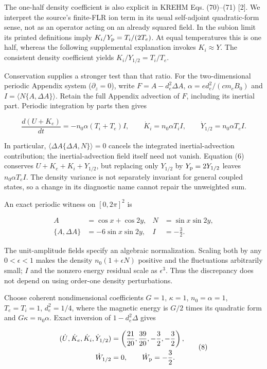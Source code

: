 The one-half density coefficient is also explicit in KREHM Eqs.
(70)--(71) {[}2{]}. We interpret the source's finite-FLR ion term in its
usual self-adjoint quadratic-form sense, not as an operator acting on an
already squared field. In the subion limit its printed definitions imply
\(K_i/Y_{\rm p}=T_i/(2T_e)\). At equal temperatures this is one half,
whereas the following supplemental explanation invokes \(K_i\approx Y\).
The consistent density coefficient yields \(K_i/Y_{1/2}=T_i/T_e\).

Conservation supplies a stronger test than that ratio. For the
two-dimensional periodic Appendix system (\(\partial_z=0\)), write
\(F=A-d_e^2\Delta A\), \(\alpha=ed_e^2/(cm_eB_0)\) and
\(I=\langle N\{A,\Delta A\}\rangle\). Retain the full Appendix advection
of \(F\), including its inertial part. Periodic integration by parts
then gives

\[
\frac{d(U+K_e)}{dt}=-n_0\alpha(T_i+T_e)I,\qquad
\dot K_i=n_0\alpha T_i I,\qquad
\dot Y_{1/2}=n_0\alpha T_e I.
\tag{6}
\]

In particular, \(\langle\Delta A\{\Delta A,N\}\rangle=0\) cancels the
integrated inertial-advection contribution; the inertial-advection field
itself need not vanish. Equation (6) conserves \(U+K_e+K_i+Y_{1/2}\),
but replacing only \(Y_{1/2}\) by \(Y_{\rm p}=2Y_{1/2}\) leaves
\(n_0\alpha T_e I\). The density variance is not separately invariant
for general coupled states, so a change in its diagnostic name cannot
repair the unweighted sum.

An exact periodic witness on \([0,2\pi]^2\) is

\[
\begin{aligned}
A&=\cos x+\cos2y,& N&=\sin x\sin2y,\\
\{A,\Delta A\}&=-6\sin x\sin2y,& I&=-\frac32.
\end{aligned}
\tag{7}
\]

The unit-amplitude fields specify an algebraic normalization. Scaling
both by any \(0<\epsilon<1\) makes the density \(n_0(1+\epsilon N)\)
positive and the fluctuations arbitrarily small; \(I\) and the nonzero
energy residual scale as \(\epsilon^3\). Thus the discrepancy does not
depend on using order-one density perturbations.

Choose coherent nondimensional coefficients \(G=1\), \(\kappa=1\),
\(n_0=\alpha=1\), \(T_e=T_i=1\), \(d_e^2=1/4\), where the magnetic
energy is \(G/2\) times its quadratic form and \(G\kappa=n_0\alpha\).
Exact inversion of \(1-d_e^2\Delta\) gives

\[
\begin{aligned}
(\dot U,\dot K_e,\dot K_i,\dot Y_{1/2})
&=\left(\frac{21}{20},\frac{39}{20},-\frac32,-\frac32\right),\\
\dot W_{1/2}&=0,\qquad \dot W_{\rm p}=-\frac32.
\end{aligned}
\tag{8}
\]


